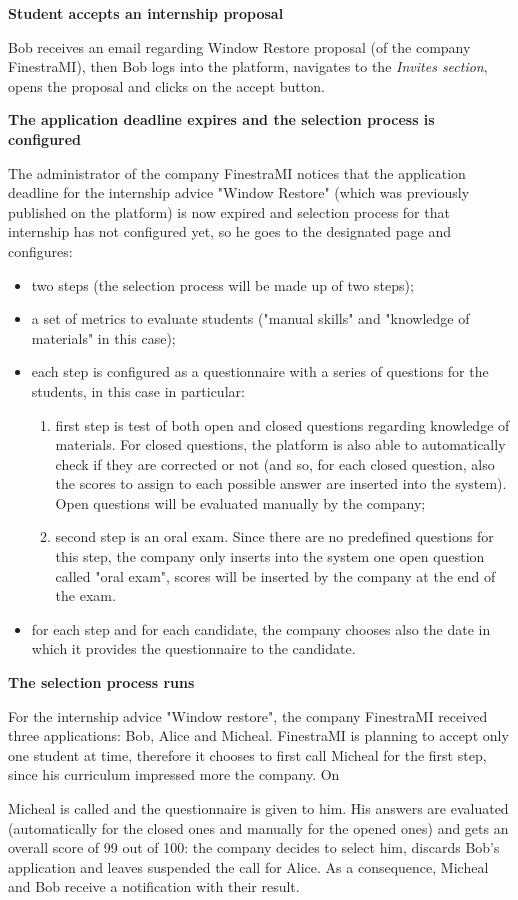 		\textbf{Student accepts an internship proposal}
		\begin{flushleft}
			Bob receives an email regarding Window Restore proposal (of the company FinestraMI), then Bob logs into the platform, navigates to the \emph{Invites section}, opens the proposal and clicks on the accept button.
		\end{flushleft}
		\textbf{The application deadline expires and the selection process is configured}
		\begin{flushleft}
			The administrator of the company FinestraMI notices that the application deadline for the internship advice "Window Restore" (which was previously published on the platform) is now expired and selection process for that internship has not configured yet, so he goes to the designated page and configures:
			\begin{itemize}
				\item two steps (the selection process will be made up of two steps);
				\item a set of metrics to evaluate students ("manual skills" and "knowledge of materials" in this case);
				\item each step is configured as a questionnaire with a series of questions for the students, in this case in particular:
				\begin{enumerate}
					\item first step is test of both open and closed questions regarding knowledge of materials. For closed questions, the platform is also able to automatically check if they are corrected or not (and so, for each closed question, also the scores to assign to each possible answer are inserted into the system). Open questions will be evaluated manually by the company;
					\item second step is an oral exam. Since there are no predefined questions for this step, the company only inserts into the system one open question called "oral exam", scores will be inserted by the company at the end of the exam.
				\end{enumerate}
				\item for each step and for each candidate, the company chooses also the date in which it provides the questionnaire to the candidate.
			\end{itemize}
		\end{flushleft}
		\textbf{The selection process runs}
		\begin{flushleft}
			For the internship advice "Window restore", the company FinestraMI received three applications: Bob, Alice and Micheal. FinestraMI is planning to accept only one student at time, therefore it chooses to first call Micheal for the first step, since his curriculum impressed more the company. On \date{23/11/2024} Micheal is called and the questionnaire is given to him. His answers are evaluated (automatically for the closed ones and manually for the opened ones) and gets an overall score of 99 out of 100: the company decides to select him, discards Bob's application and leaves suspended the call for Alice. As a consequence, Micheal and Bob receive a notification with their result.
		\end{flushleft}
